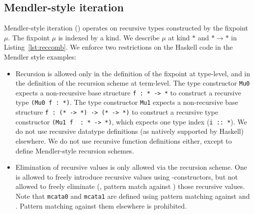 \subsection{Mendler-style iteration}
\label{sec:mendler:it}
Mendler-style iteration (\MIt{}) operates on recursive types constructed by
the fixpoint $\mu$. The fixpoint $\mu$ is indexed by a kind. We describe
$\mu$ at kind $*$ and $*\to*$ in Listing~\ref{lst:reccomb}.
We enforce two restrictions on the Haskell code in the Mendler style examples:
\begin{itemize}
\item Recursion is allowed only in the definition of the fixpoint at type-level,
and in the definition of the recursion scheme at term-level.
The type constructor \lstinline{Mu0} expects a non-recursive base structure
\lstinline{f : * -> *} to construct a recursive type \lstinline{(Mu0 f : *)}.
The type constructor \lstinline{Mu1} expects a non-recursive base structure
\lstinline{f : (* -> *) -> (* -> *)} to construct a recursive type constructor
\lstinline{(Mu1 f  : * -> *)}, which expects one type index
(\lstinline{i :: *}). We do not use recursive datatype definitions (as
natively supported by Haskell) elsewhere. We do not use recursive function
definitions either, except to define Mendler-style recursion schemes.

\item Elimination of recursive values is only allowed via the recursion scheme.
One is allowed to freely introduce recursive values using \In{}-constructors,
but not allowed to freely eliminate (\ie, pattern match against \In{})
those recursive values. Note that \lstinline{mcata0} and \lstinline{mcata1}
are defined using pattern matching against \In{*} and \In{*\to*}.
Pattern matching against them elsewhere is prohibited.
\end{itemize}

